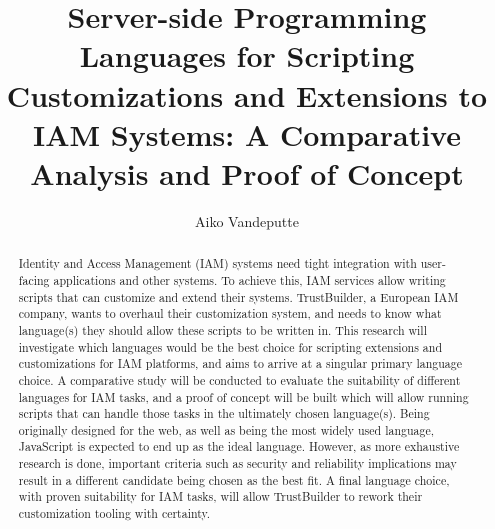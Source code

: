 \documentclass[english]{hogent-article}
\title{Server-side Programming Languages for Scripting Customizations and Extensions to IAM Systems: A Comparative Analysis and Proof of Concept}
\author{Aiko Vandeputte}
\begin{document}
\begin{abstract}
  Identity and Access Management (IAM) systems need tight integration with user-facing applications and other systems. To achieve this, IAM services allow writing scripts that can customize and extend their systems. TrustBuilder, a European IAM company, wants to overhaul their customization system, and needs to know what language(s) they should allow these scripts to be written in. This research will investigate which languages would be the best choice for scripting extensions and customizations for IAM platforms, and aims to arrive at a singular primary language choice. A comparative study will be conducted to evaluate the suitability of different languages for IAM tasks, and a proof of concept will be built which will allow running scripts that can handle those tasks in the ultimately chosen language(s). Being originally designed for the web, as well as being the most widely used language, JavaScript is expected to end up as the ideal language. However, as more exhaustive research is done, important criteria such as security and reliability implications may result in a different candidate being chosen as the best fit. A final language choice, with proven suitability for IAM tasks, will allow TrustBuilder to rework their customization tooling with certainty.
\end{abstract}

\tableofcontents



\printbibliography[heading=bibintoc]
\end{document}
